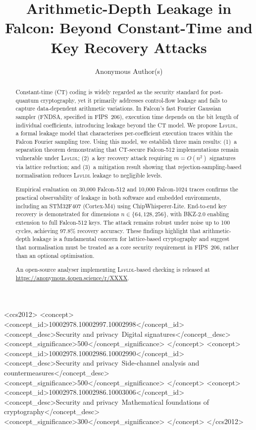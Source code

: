 \documentclass[sigconf,anonymous]{acmart}
\begin{document}
\title{Arithmetic-Depth Leakage in Falcon: Beyond Constant-Time and Key Recovery Attacks}

\author{Anonymous Author(s)}

\begin{abstract}
Constant-time (CT) coding is widely regarded as the security standard for
post-quantum cryptography, yet it primarily addresses control-flow leakage and
fails to capture data-dependent arithmetic variations.  In Falcon's fast
Fourier Gaussian sampler (FNDSA, specified in FIPS~206), execution time depends
on the bit length of individual coefficients, introducing leakage beyond the CT
model.  We propose \textsc{Lffldl}, a formal leakage model that characterises
per-coefficient execution traces within the Falcon Fourier sampling tree.
Using this model, we establish three main results: (1)~a separation theorem
demonstrating that CT-secure Falcon-512 implementations remain vulnerable under
\textsc{Lffldl}; (2)~a key recovery attack requiring $m = O(n^2)$ signatures
via lattice reduction; and (3)~a mitigation result showing that
rejection-sampling-based normalisation reduces \textsc{Lffldl} leakage to
negligible levels.

Empirical evaluation on 30{,}000 Falcon-512 and 10{,}000 Falcon-1024 traces
confirms the practical observability of leakage in both software and embedded
environments, including an STM32F407 (Cortex-M4) using ChipWhisperer-Lite.
End-to-end key recovery is demonstrated for dimensions $n \in \{64,128,256\}$,
with BKZ-2.0 enabling extension to full Falcon-512 keys.  The attack remains
robust under noise up to 100 cycles, achieving 97.8\% recovery accuracy.
These findings highlight that arithmetic-depth leakage is a fundamental concern
for lattice-based cryptography and suggest that normalisation must be treated as
a core security requirement in FIPS~206, rather than an optional optimisation.

An open-source analyser implementing \textsc{Lffldl}-based checking is released
at \url{https://anonymous.4open.science/r/XXXX}.
\end{abstract}

\begin{CCSXML}
<ccs2012>
  <concept>
    <concept_id>10002978.10002997.10002998</concept_id>
    <concept_desc>Security and privacy~Digital signatures</concept_desc>
    <concept_significance>500</concept_significance>
  </concept>
  <concept>
    <concept_id>10002978.10002986.10002990</concept_id>
    <concept_desc>Security and privacy~Side-channel analysis and countermeasures</concept_desc>
    <concept_significance>500</concept_significance>
  </concept>
  <concept>
    <concept_id>10002978.10002986.10003006</concept_id>
    <concept_desc>Security and privacy~Mathematical foundations of cryptography</concept_desc>
    <concept_significance>300</concept_significance>
  </concept>
</ccs2012>
\end{CCSXML}
\end{document}
